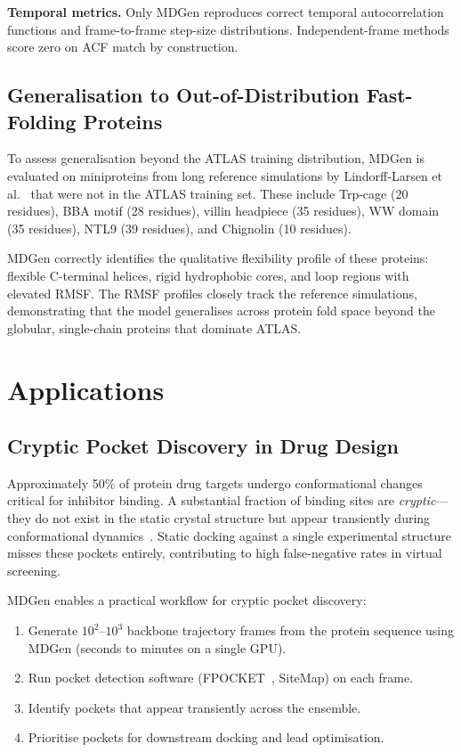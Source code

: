 \documentclass[11pt,a4paper]{article}
\begin{document}
\textbf{Temporal metrics.}  Only MDGen reproduces correct temporal autocorrelation functions and
frame-to-frame step-size distributions.  Independent-frame methods score zero on ACF match by
construction.

\subsection{Generalisation to Out-of-Distribution Fast-Folding Proteins}

To assess generalisation beyond the ATLAS training distribution, MDGen is evaluated on
miniproteins from long reference simulations by Lindorff-Larsen et al.~\cite{lindorff2011} that
were not in the ATLAS training set.  These include Trp-cage (20 residues), BBA motif (28
residues), villin headpiece (35 residues), WW domain (35 residues), NTL9 (39 residues), and
Chignolin (10 residues).

MDGen correctly identifies the qualitative flexibility profile of these proteins: flexible C-terminal
helices, rigid hydrophobic cores, and loop regions with elevated RMSF.  The RMSF profiles closely
track the reference simulations, demonstrating that the model generalises across protein fold space
beyond the globular, single-chain proteins that dominate ATLAS.


\section{Applications}
\label{sec:applications}

\subsection{Cryptic Pocket Discovery in Drug Design}

Approximately 50\% of protein drug targets undergo conformational changes critical for inhibitor
binding.  A substantial fraction of binding sites are \emph{cryptic}---they do not exist in the
static crystal structure but appear transiently during conformational dynamics~\cite{oleinikovas2016}.
Static docking against a single experimental structure misses these pockets entirely, contributing
to high false-negative rates in virtual screening.

MDGen enables a practical workflow for cryptic pocket discovery:
\begin{enumerate}[leftmargin=2em]
  \item Generate $10^2$--$10^3$ backbone trajectory frames from the protein sequence using MDGen
    (seconds to minutes on a single GPU).
  \item Run pocket detection software (FPOCKET~\cite{le2009}, SiteMap) on each frame.
  \item Identify pockets that appear transiently across the ensemble.
  \item Prioritise pockets for downstream docking and lead optimisation.
\end{enumerate}
\end{document}
